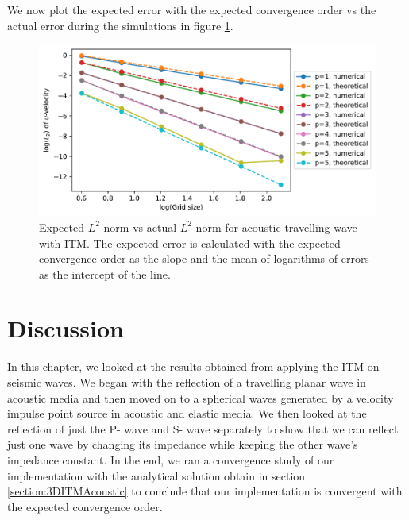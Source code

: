 We now plot the expected error with the expected convergence order vs the actual error during the simulations in figure \ref{fig:expectedvsactualerror}.

\begin{figure}
    \centering
    \includegraphics[width=\linewidth]{figures/error3.pdf}
    \caption{Expected $L^2$ norm vs actual $L^2$ norm for acoustic travelling wave with \ac{ITM}. The expected error is calculated with the expected convergence order
    as the slope and the mean of logarithms of errors as the intercept of the line.}
    \label{fig:expectedvsactualerror}
\end{figure}

\section{Discussion}
In this chapter, we looked at the results obtained from applying the \ac{ITM} on seismic waves. We began with the reflection of a travelling planar wave in acoustic media
and then moved on to a spherical waves generated by a velocity impulse point source in acoustic and elastic media. 
We then looked at the reflection of just the P- wave and S- wave separately to show that we can reflect just one wave by changing its impedance while keeping the other wave's impedance constant.
In the end, we ran a convergence study of our implementation with the analytical solution obtain in section \ref{section:3DITMAcoustic} to conclude that our implementation
is convergent with the expected convergence order. \\